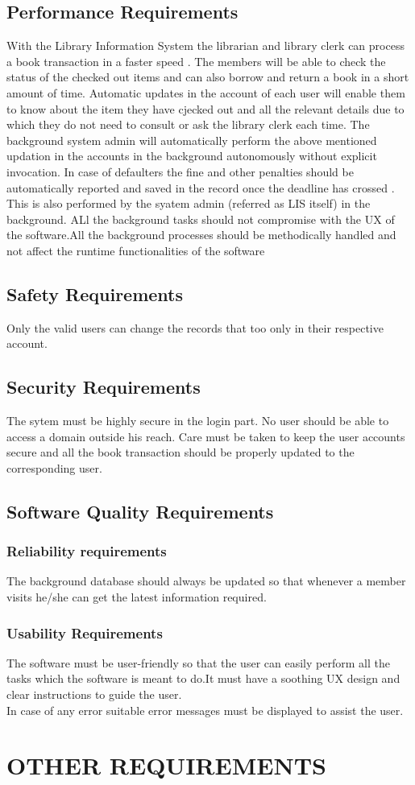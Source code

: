 \documentclass{article}
\begin{document}
\subsection{Performance Requirements}
With the Library Information System the librarian and library clerk can process a book transaction in a faster speed .
The members will be able to check the status of the checked out items and can also borrow and return a book in a short amount of time.
Automatic updates in the account of each user will enable them to know about the item they have cjecked out and all the relevant details due to which they do not need to consult or ask the library clerk each time.
The background system admin will automatically perform the above mentioned updation in the accounts in the background autonomously without explicit invocation.
In case of defaulters the fine and other penalties should be automatically reported and saved in the record once the deadline has crossed . This is also performed by the syatem admin (referred as LIS itself) in the background.
ALl the background tasks should not compromise with the UX of the software.All the background processes should be methodically handled and not affect the runtime functionalities of the software

\subsection{Safety Requirements}
Only the valid users can change the records that too only in their respective account.
\subsection{Security Requirements}
The sytem must be highly secure in the login part.
No user should be able to access a domain outside his reach.
Care must be taken to keep the user accounts secure and all the book transaction should be properly updated to the corresponding user.

\subsection{Software Quality Requirements}


\subsubsection{Reliability requirements}
The background database should always be updated so that whenever a member visits he/she can get the latest information required.
\subsubsection{Usability Requirements}
The software must be user-friendly so that the user can easily perform all the tasks which the software is meant to do.It must have a soothing UX design and clear instructions to guide the user.
\\In case of any error suitable error messages must be displayed to assist the user.


\section{OTHER REQUIREMENTS}
\end{document}

